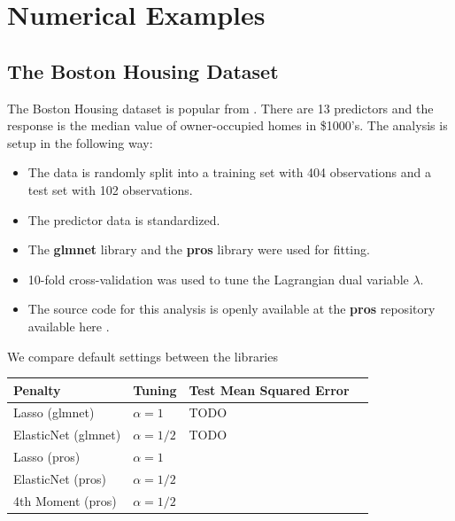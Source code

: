 \documentclass[article]{jss}
\numberwithin{equation}{section}
\begin{document}
\section{Numerical Examples}

\subsection{The Boston Housing Dataset}

The Boston Housing dataset is popular from \cite{boston_housing}.
There are 13 predictors and the response is the median value of owner-occupied homes in \$1000's. The analysis is setup in the following way:

\begin{itemize}
\item The data is randomly split into a training set with 404 observations and a test set with 102 observations.


\item The predictor data is standardized.

\item The \textbf{glmnet} library and the \textbf{pros} library were used for fitting.

\item 10-fold cross-validation was used to tune the Lagrangian dual variable $\lambda$.

\item The source code for this analysis is openly available at the \textbf{pros} repository available here \cite{pros}.

\end{itemize}

We compare default settings between the libraries

\begin{center}
\setlength{\tabcolsep}{20pt} %
\renewcommand{\arraystretch}{1} %
\begin{tabular}{lllp{7.4cm}}
\hline
Penalty & Tuning & Test Mean Squared Error \\ \hline
Lasso (glmnet) & $\alpha = 1$ & TODO \\
ElasticNet (glmnet) & $\alpha = 1/2$  & TODO   \\
Lasso (pros) & $\alpha = 1$ &  \\
ElasticNet (pros) & $\alpha = 1/2$ &  \\
4th Moment (pros) & $\alpha = 1/2$ &  \\ \hline
\end{tabular}
\end{center}
\end{document}
